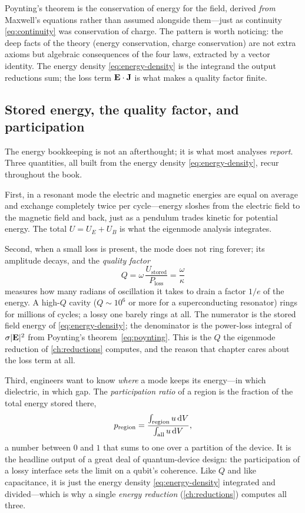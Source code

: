 \begin{keyidea}
Poynting's theorem is the conservation of energy for the field, derived
\emph{from} Maxwell's equations rather than assumed alongside them---just as
continuity \eqref{eq:continuity} was conservation of charge. The pattern is
worth noticing: the deep facts of the theory (energy conservation, charge
conservation) are not extra axioms but algebraic consequences of the four laws,
extracted by a vector identity. The energy density \eqref{eq:energy-density} is
the integrand the output reductions sum; the loss term $\mathbf{E}\cdot\mathbf{J}$ is what
makes a quality factor finite.
\end{keyidea}

\subsection{Stored energy, the quality factor, and participation}
\label{sec:Q}

The energy bookkeeping is not an afterthought; it is what most analyses
\emph{report}. Three quantities, all built from the energy density
\eqref{eq:energy-density}, recur throughout the book.

First, in a resonant mode the electric and magnetic energies are equal on
average and exchange completely twice per cycle---energy sloshes from the
electric field to the magnetic field and back, just as a pendulum trades
kinetic for potential energy. The total $U=U_E+U_B$ is what the eigenmode
analysis integrates.

Second, when a small loss is present, the mode does not ring forever; its
amplitude decays, and the \emph{quality factor}
\[
  Q = \omega\,\frac{U_{\text{stored}}}{P_{\text{loss}}}
    = \frac{\omega}{\kappa}
\]
measures how many radians of oscillation it takes to drain a factor $1/e$ of the
energy. A high-$Q$ cavity ($Q\sim10^6$ or more for a superconducting resonator)
rings for millions of cycles; a lossy one barely rings at all. The numerator is
the stored field energy of \eqref{eq:energy-density}; the denominator is the
power-loss integral of $\sigma\lvert\mathbf{E}\rvert^2$ from Poynting's
theorem~\eqref{eq:poynting}. This is the $Q$ the eigenmode reduction of
\cref{ch:reductions} computes, and the reason that chapter cares about the loss
term at all.

Third, engineers want to know \emph{where} a mode keeps its energy---in which
dielectric, in which gap. The \emph{participation ratio} of a region is the
fraction of the total energy stored there,
\[
  p_{\text{region}} = \frac{\int_{\text{region}} u\,\mathrm{d}V}{\int_{\text{all}} u\,\mathrm{d}V},
\]
a number between $0$ and $1$ that sums to one over a partition of the device. It
is the headline output of a great deal of quantum-device design: the
participation of a lossy interface sets the limit on a qubit's coherence. Like
$Q$ and like capacitance, it is just the energy density
\eqref{eq:energy-density} integrated and divided---which is why a single
\emph{energy reduction} (\cref{ch:reductions}) computes all three.

